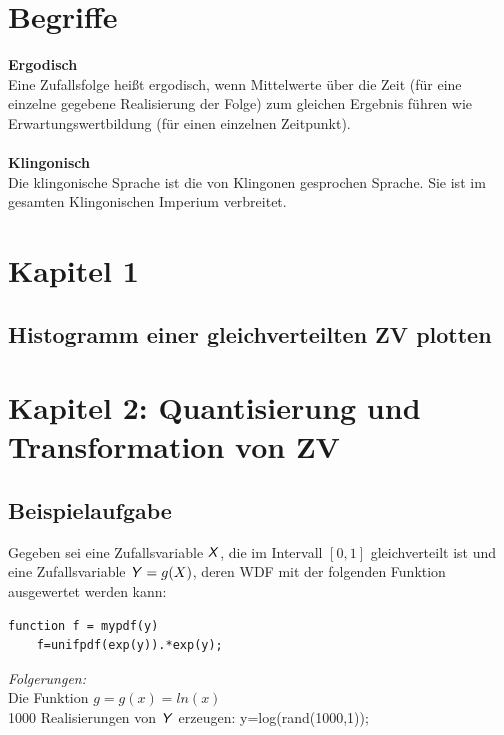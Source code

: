 \documentclass[deutsch]{latex4ei/latex4ei_sheet}
\begin{document}
\section{Begriffe}
\begin{sectionbox}
	\textbf{Ergodisch}\\
	Eine Zufallsfolge heißt ergodisch, wenn Mittelwerte über die Zeit (für
	eine einzelne gegebene Realisierung der Folge) zum gleichen Ergebnis führen wie
	Erwartungswertbildung (für einen einzelnen Zeitpunkt).\\\\
	\textbf{Klingonisch}\\
	Die klingonische Sprache ist die von Klingonen gesprochen Sprache. Sie ist im gesamten Klingonischen Imperium verbreitet.
	
\end{sectionbox}


\section{Kapitel 1}
\begin{sectionbox}
	\subsection{Histogramm einer gleichverteilten ZV plotten}
	
\end{sectionbox}

\section{Kapitel 2: Quantisierung und Transformation von ZV}
\begin{sectionbox}
	\subsection{Beispielaufgabe}
	Gegeben sei eine Zufallsvariable $\operatorname{\textsf{\textit{X}}}$, die im Intervall $[0, 1]$ gleichverteilt ist und eine Zufallsvariable $\operatorname{\textsf{\textit{Y}}}=g(X)$, deren WDF mit der folgenden Funktion ausgewertet werden kann:
	\begin{lstlisting}[gobble=4]
	function f = mypdf(y)
	f=unifpdf(exp(y)).*exp(y);	
	\end{lstlisting}
	\emph{Folgerungen:}\\
	Die Funktion $g=g(x)=ln(x)$\\
	1000 Realisierungen von $\operatorname{\textsf{\textit{Y}}}$ erzeugen: y=log(rand(1000,1));\\
\end{sectionbox}
\end{document}
